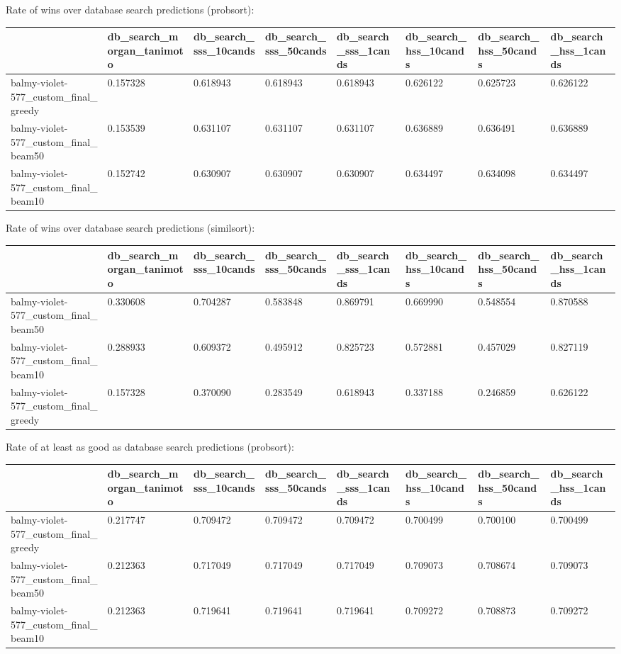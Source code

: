 Rate of wins over database search predictions (probsort):
\begin{tabular}{llllllll}
\toprule
 & db_search_morgan_tanimoto & db_search_sss_10cands & db_search_sss_50cands & db_search_sss_1cands & db_search_hss_10cands & db_search_hss_50cands & db_search_hss_1cands \\
\midrule
balmy-violet-577_custom_final_greedy & 0.157328 & 0.618943 & 0.618943 & 0.618943 & 0.626122 & 0.625723 & 0.626122 \\
balmy-violet-577_custom_final_beam50 & 0.153539 & 0.631107 & 0.631107 & 0.631107 & 0.636889 & 0.636491 & 0.636889 \\
balmy-violet-577_custom_final_beam10 & 0.152742 & 0.630907 & 0.630907 & 0.630907 & 0.634497 & 0.634098 & 0.634497 \\
\bottomrule
\end{tabular}



Rate of wins over database search predictions (similsort):
\begin{tabular}{llllllll}
\toprule
 & db_search_morgan_tanimoto & db_search_sss_10cands & db_search_sss_50cands & db_search_sss_1cands & db_search_hss_10cands & db_search_hss_50cands & db_search_hss_1cands \\
\midrule
balmy-violet-577_custom_final_beam50 & 0.330608 & 0.704287 & 0.583848 & 0.869791 & 0.669990 & 0.548554 & 0.870588 \\
balmy-violet-577_custom_final_beam10 & 0.288933 & 0.609372 & 0.495912 & 0.825723 & 0.572881 & 0.457029 & 0.827119 \\
balmy-violet-577_custom_final_greedy & 0.157328 & 0.370090 & 0.283549 & 0.618943 & 0.337188 & 0.246859 & 0.626122 \\
\bottomrule
\end{tabular}



Rate of at least as good as database search predictions (probsort):
\begin{tabular}{llllllll}
\toprule
 & db_search_morgan_tanimoto & db_search_sss_10cands & db_search_sss_50cands & db_search_sss_1cands & db_search_hss_10cands & db_search_hss_50cands & db_search_hss_1cands \\
\midrule
balmy-violet-577_custom_final_greedy & 0.217747 & 0.709472 & 0.709472 & 0.709472 & 0.700499 & 0.700100 & 0.700499 \\
balmy-violet-577_custom_final_beam50 & 0.212363 & 0.717049 & 0.717049 & 0.717049 & 0.709073 & 0.708674 & 0.709073 \\
balmy-violet-577_custom_final_beam10 & 0.212363 & 0.719641 & 0.719641 & 0.719641 & 0.709272 & 0.708873 & 0.709272 \\
\bottomrule
\end{tabular}



